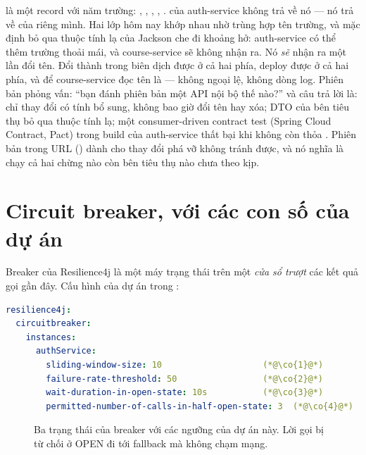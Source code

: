  là một record với năm trường: , ,
, , . 
của auth-service không trả về nó --- nó trả về  của
riêng mình. Hai lớp hôm nay khớp nhau nhờ trùng hợp tên trường, và mặc
định bỏ qua thuộc tính lạ của Jackson che đi khoảng hở: auth-service
có thể thêm trường thoải mái, và course-service sẽ không nhận ra. Nó
\emph{sẽ} nhận ra một lần đổi tên. Đổi  thành
 trong  biên dịch được ở cả hai
phía, deploy được ở cả hai phía, và để course-service đọc tên là
 --- không ngoại lệ, không dòng log. Phiên bản phỏng vấn:
``bạn đánh phiên bản một API nội bộ thế nào?'' và câu trả lời là: chỉ
thay đổi có tính bổ sung, không bao giờ đổi tên hay xóa; DTO của bên
tiêu thụ bỏ qua thuộc tính lạ; một consumer-driven contract test
(Spring Cloud Contract, Pact) trong build của auth-service thất bại khi
 không còn thỏa . Phiên bản trong URL
() dành cho thay đổi phá vỡ không tránh được, và nó
nghĩa là chạy cả hai chừng nào còn bên tiêu thụ nào chưa theo kịp.

\section{Circuit breaker, với các con số của dự án}
\label{sec:cb-math}

Breaker của Resilience4j là một máy trạng thái trên một \emph{cửa sổ
trượt} các kết quả gọi gần đây. Cấu hình của dự án trong
:

\begin{lstlisting}[language=yaml]
resilience4j:
  circuitbreaker:
    instances:
      authService:
        sliding-window-size: 10                    (*@\co{1}@*)
        failure-rate-threshold: 50                 (*@\co{2}@*)
        wait-duration-in-open-state: 10s           (*@\co{3}@*)
        permitted-number-of-calls-in-half-open-state: 3  (*@\co{4}@*)
\end{lstlisting}

\begin{figure}[htb]
\centering
{}
\caption{Ba trạng thái của breaker với các ngưỡng của dự án này. Lời
gọi bị từ chối ở OPEN đi tới fallback mà không chạm mạng.}
\label{fig:cb-states}
\end{figure}

